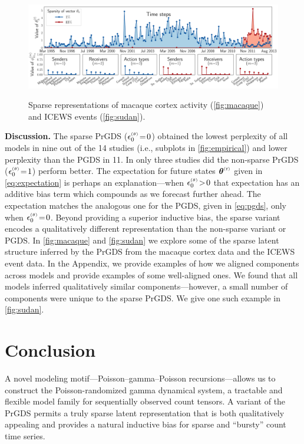 \documentclass{article}
\begin{document}
\begin{figure}[t]
{
\label{fig:sudan}
\includegraphics[width=\linewidth]{../../fig/components/icews/zero-ordering/double_plots/eps0-components72-0.pdf}
}
% 
\caption{\label{fig:exploratory} Sparse representations of macaque cortex activity (\cref{fig:macaque}) and ICEWS events (\cref{fig:sudan}).}\vspace{-1em}
\end{figure}

\textbf{Discussion.} The sparse PrGDS ($\epstheta \teq 0$) obtained the lowest perplexity of all models in nine out of the 14 studies (i.e., subplots in \cref{fig:empirical}) and lower perplexity than the PGDS in 11. In only three studies did the non-sparse PrGDS ($\epstheta \teq 1$) perform better. The expectation for future states $\boldsymbol{\theta}^{\mathsmaller{(t)}}$ given in \cref{eq:expectation} is perhaps an explanation---when $\epstheta \!>\! 0$ that expectation has an additive bias term which compounds as we forecast further ahead. The expectation matches the analogous one for the PGDS, given in \cref{eq:pgds}, only when $\epstheta \teq 0$. Beyond providing a superior inductive bias, the sparse variant encodes a qualitatively different representation than the non-sparse variant or PGDS. In \cref{fig:macaque} and \cref{fig:sudan} we explore some of the sparse latent structure inferred by the PrGDS from the macaque cortex data and the ICEWS event data. In the Appendix, we provide examples of how we aligned components across models and provide examples of some well-aligned ones. We found that all models inferred qualitatively similar components---however, a small number of components were unique to the sparse PrGDS. We give one such example in \cref{fig:sudan}.

\vspace{-0.5em}\section{Conclusion}\vspace{-0.5em} A novel modeling motif---Poisson--gamma--Poisson recursions---allows us to construct the Poisson-randomized gamma dynamical system, a tractable and flexible model family for sequentially observed count tensors. A variant of the PrGDS permits a truly sparse latent representation that is both qualitatively appealing and provides a natural inductive bias for sparse and ``bursty'' count time series.
\end{document}
